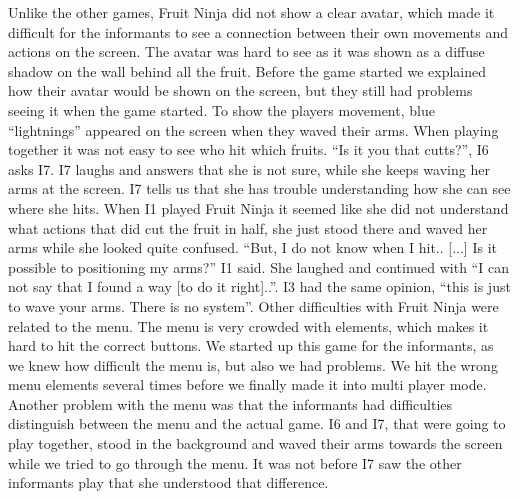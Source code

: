 Unlike the other games, Fruit Ninja did not show a clear avatar, which made it difficult for the informants to see a connection between their own movements and actions on the screen. The avatar was hard to see as it was shown as a diffuse shadow on the wall behind all the fruit. Before the game started we explained how their avatar would be shown on the screen, but they still had problems seeing it when the game started. To show the players movement, blue “lightnings” appeared on the screen when they waved their arms. When playing together it was not easy to see who hit which fruits. “Is it you that cutts?”, I6 asks I7. I7 laughs and answers that she is not sure, while she keeps waving her arms at the screen. I7 tells us that she has trouble understanding how she can see where she hits. When I1 played Fruit Ninja it seemed like she did not understand what actions that did cut the fruit in half, she just stood there and waved her arms while she looked quite confused. “But, I do not know when I hit.. [...] Is it possible to positioning my arms?” I1 said. She laughed and continued with “I can not say that I found a way [to do it right]..”. I3 had the same opinion, “this is just to wave your arms. There is no system”. Other difficulties with Fruit Ninja were related to the menu. The menu is very crowded with elements, which makes it hard to hit the correct buttons. We started up this game for the informants, as we knew how difficult the menu is, but also we had problems. We hit the wrong menu elements several times  before we finally made it into multi player mode. Another problem with the menu was that the informants had difficulties distinguish between the menu and the actual game. I6 and I7, that were going to play together, stood in the background and waved their arms towards the screen while we tried to go through the menu. It was not before I7 saw the other informants play that she understood that difference. 

